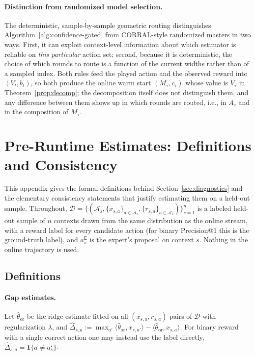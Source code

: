 \documentclass{article}
\theoremstyle{definition}
\theoremstyle{remark}
\newcommand{\ind}{\mathbf{1}}
\theoremstyle{remark}
\newcommand{\Exp}{\mathsf{E}}
\begin{document}
\paragraph{Distinction from randomized model selection.}
The deterministic, sample-by-sample geometric routing distinguishes
Algorithm~\ref{alg:confidence-gated} from CORRAL-style randomized
masters in two ways. First, it can exploit context-level information
about which estimator is reliable on \emph{this particular} action
set; second, because it is deterministic, the choice of which rounds to route
is a function of the current widths rather than of a sampled index. Both
rules feed the played action and the observed reward into $(V_t,b_t)$, so
both produce the online warm start $(M_\tau,c_\tau)$ whose value is
$V_\tau$ in Theorem~\ref{prop:decomp}; the decomposition itself does not
distinguish them, and any difference between them shows up in which rounds
are routed, i.e., in $A_\tau$ and in the composition of $M_\tau$.


\section{Pre-Runtime Estimates: Definitions and Consistency}
\label{app:diagnostics}

This appendix gives the formal definitions behind Section~\ref{sec:diagnostics}
and the elementary consistency statements that justify estimating them on a
held-out sample. Throughout, $\mathcal D=\{(\mathcal A_s,\{x_{s,a}\}_{a\in\mathcal A_s},\{r_{s,a}\}_{a\in\mathcal A_s})\}_{s=1}^{n}$
is a labeled held-out sample of $n$ contexts drawn from the same distribution
as the online stream, with a reward label for every candidate action (for
binary Precision@1 this is the ground-truth label), and $a_s^{\Exp}$ is the
expert's proposal on context $s$. Nothing in the online trajectory is used.

\subsection{Definitions}
\label{app:diag-defs}

\paragraph{Gap estimates.} Let $\widehat\theta_{\mathrm{or}}$ be the ridge
estimate fitted on all $(x_{s,a},r_{s,a})$ pairs of $\mathcal D$ with
regularization $\lambda$, and
$\widehat\Delta_{s,a}:=\max_{a'}\langle\widehat\theta_{\mathrm{or}},x_{s,a'}\rangle-\langle\widehat\theta_{\mathrm{or}},x_{s,a}\rangle$.
For binary reward with a single correct action one may instead use the label
directly, $\widehat\Delta_{s,a}=\ind\{a\ne a_s^\star\}$.
\end{document}
